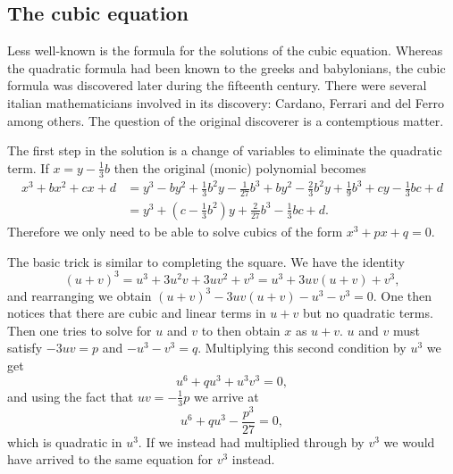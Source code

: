 \documentclass[12pt,oneside]{book}
\begin{document}
\subsection{The cubic equation}
Less well-known is the formula for the solutions of the cubic equation. Whereas the quadratic formula had been known to the greeks and babylonians, the cubic formula was discovered later during the fifteenth century. There were several italian mathematicians involved in its discovery: Cardano, Ferrari and del Ferro among others. The question of the original discoverer is a contemptious matter. 

The first step in the solution is a change of variables to eliminate the quadratic term. If \( x = y - \frac{1}{3}b \) then the original (monic) polynomial becomes
\begin{align*}
	x^3 + bx^2 + cx + d &= y^3 - by^2 + \frac{1}{3}b^2 y - \frac{1}{27}b^3 + by^2 - \frac{2}{3}b^2y + \frac{1}{9}b^3 + cy - \frac{1}{3}bc + d \\
											&= y^3 + \left(c - \frac{1}{3}b^2 \right)y + \frac{2}{27}b^3 - \frac{1}{3}bc + d.
\end{align*}
Therefore we only need to be able to solve cubics of the form \( x^3 + px + q = 0 \). 

The basic trick is similar to completing the square. We have the identity
\begin{equation*}
	(u+v)^3 = u^3 + 3u^2v + 3uv^2 + v^3 = u^3 + 3uv(u+v) + v^3,
\end{equation*}
and rearranging we obtain \( (u+v)^3 - 3uv(u+v) - u^3 - v^3 = 0 \). One then notices that there are cubic and linear terms in \( u+v \) but no quadratic terms. Then one tries to solve for \( u \) and \( v \) to then obtain \( x \) as \( u+v \). \( u \) and \( v \) must satisfy \( -3uv = p \) and \( -u^3 - v^3 = q \). Multiplying this second condition by \( u^3 \) we get
\begin{equation*}
	u^6 + qu^3 + u^3v^3 = 0,
\end{equation*}
and using the fact that \( uv = -\frac{1}{3}p \) we arrive at
\begin{equation*}
	u^6 + qu^3 - \frac{p^3}{27} = 0,
\end{equation*}
which is quadratic in \( u^3 \). If we instead had multiplied through by \( v^3 \) we would have arrived to the same equation for \( v^3 \) instead.
\end{document}
